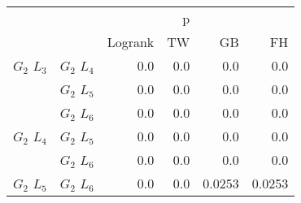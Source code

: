       \begin{table}
        \centering
        \begin{tabular}{llrrrr}
          \toprule
                       &             &         &  p &    &     \\
          \cmidrule{3-6}
                       &             & Logrank & TW & GB & FH  \\
          \midrule
          $G_2$ $L_3$  & $G_2$ $L_4$  &  0.0 &  0.0 &  0.0 &  0.0     \\
                       & $G_2$ $L_5$  & 0.0 & 0.0 & 0.0 & 0.0    \\
                       & $G_2$ $L_6$  & 0.0 & 0.0 & 0.0 & 0.0      \\
          $G_2$ $L_4$  & $G_2$ $L_5$  & 0.0 & 0.0 & 0.0 & 0.0      \\
                       & $G_2$ $L_6$  & 0.0 & 0.0 & 0.0 & 0.0       \\
          $G_2$ $L_5$   & $G_2$ $L_6$ & 0.0 & 0.0 & 0.0253 & 0.0253      \\
          \bottomrule
        \end{tabular}
        \label{tab:g2_ingroup_tests_radius}
        \caption{}
      \end{table}





















